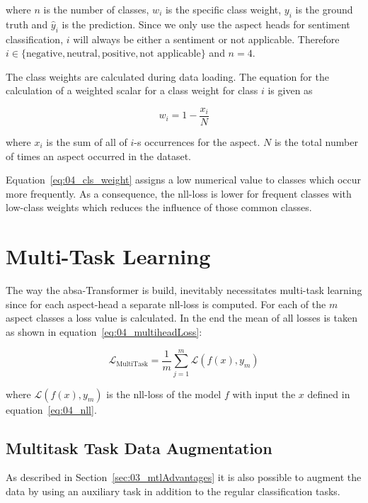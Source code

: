 where $n$ is the number of classes, $w_i$ is the specific class weight, $y_i$ is the ground truth and $\hat{y}_i$ is the prediction. Since we only use the aspect heads for sentiment classification, $i$ will always be either a sentiment or not applicable. Therefore $i \in \{\text{negative}, \text{neutral}, \text{positive}, \text{not applicable\}}$ and $n=4$.
\medskip

The class weights are calculated during data loading. The equation for the calculation of a weighted scalar for a class weight for class $i$ is given as

\begin{equation}
    w_i = 1 - \frac{x_i}{N}
\label{eq:04_cls_weight}
\end{equation}

where $x_i$ is the sum of all of $i$-s occurrences for the aspect. $N$ is the total number of times an aspect occurred in the dataset.
\medskip

Equation~\ref{eq:04_cls_weight} assigns a low numerical value to classes which occur more frequently. As a consequence, the \gls{nll}-loss is lower for frequent classes with low-class weights which reduces the influence of those common classes.  

\section{Multi-Task Learning}
\label{sec:04_multitask}
The way the \gls{absa}-Transformer is build, inevitably necessitates multi-task learning since for each aspect-head a separate \gls{nll}-loss is computed. For each of the $m$ aspect classes a loss value is calculated. In the end the mean of all losses is taken as shown in equation~\ref{eq:04_multiheadLoss}:

\begin{equation}
\mathcal{L}_\text{MultiTask} = \frac{1}{m}\sum_{j=1}^{m}\mathcal{L}(f(x), y_m)
\label{eq:04_multiheadLoss}
\end{equation}

where $\mathcal{L}(f(x), y_m)$ is the \gls{nll}-loss of the model $f$ with input the $x$ defined in equation~\ref{eq:04_nll}.

\subsection{Multitask Task Data Augmentation}

As described in Section~\ref{sec:03_mtlAdvantages} it is also possible to augment the data by using an auxiliary task in addition to the regular classification tasks.

